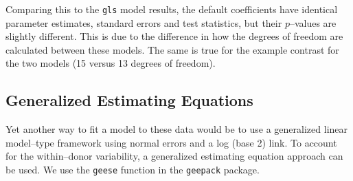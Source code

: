 \documentclass[12pt]{article}
\begin{document}
Comparing this to the \texttt{gls} model results, the default coefficients have identical parameter estimates, standard errors and test statistics, but their $p$--values are slightly different. This is due to the difference in how the degrees of freedom are calculated between these models. The same is true for the example contrast for the two models (15 versus 13 degrees of freedom).


\subsection{Generalized Estimating Equations}      
      
Yet another way to fit a model to these data would be to use a generalized linear model--type framework using normal errors and a log (base 2) link. To account for the within--donor variability, a generalized estimating equation approach can be used. We use the \texttt{geese} function in the \texttt{geepack} package.
\end{document}
